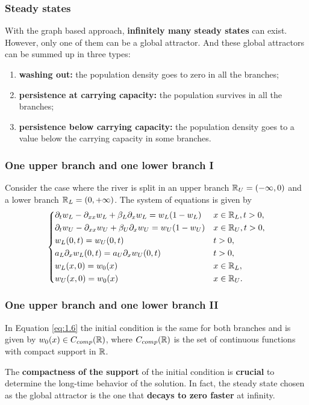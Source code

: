 \begin{frame}
    \frametitle{Steady states}
    With the graph based approach, \textbf{infinitely many steady states }can exist. However, only one of them can be a global attractor. And these global attractors can be summed up in three types:
    \begin{enumerate}
        \item \textbf{washing out:} the population density goes to zero in all the branches;
        \item \textbf{persistence at carrying capacity:} the population survives in all the branches;
        \item \textbf{persistence below carrying capacity:} the population density goes to a value below the carrying capacity in some branches.
    \end{enumerate}
\end{frame}


\begin{frame}
    \frametitle{One upper branch and one lower branch I}
    Consider the case where the river is split in an upper branch \(\mathbb{R}_U = (-\infty, 0)\) and a lower branch \(\mathbb{R}_L = (0, +\infty)\). The system of equations is given by
    \begin{equation}
        \begin{dcases}
            \partial_t w_L - \partial_{xx}w_L + \beta_L \partial_x w_L = w_L(1 - w_L) &  x \in \mathbb{R}_L, t > 0, \\
            \partial_t w_U - \partial_{xx}w_U + \beta_U \partial_x w_U = w_U(1 - w_U) & x \in \mathbb{R}_U, t > 0, \\
            w_L(0, t) = w_U(0, t) &  t > 0, \\
            a_L \partial_x w_L(0, t) = a_U \partial_x w_U(0, t) &  t > 0, \\
            w_L(x, 0) = w_{0}(x) &  x \in \mathbb{R}_L, \\
            w_U(x, 0) = w_{0}(x) &  x \in \mathbb{R}_U.
        \end{dcases}
        \label{eq:1.6}
    \end{equation}
\end{frame}


\begin{frame}
    \frametitle{One upper branch and one lower branch II}
    In Equation \eqref{eq:1.6} the initial condition is the same for both branches and is given by \(w_0(x) \in C_{comp}(\mathbb{R})\), where \(C_{comp}(\mathbb{R})\) is the set of continuous functions with compact support in \(\mathbb{R}\).

    The \textbf{compactness of the support} of the initial condition is \textbf{crucial} to determine the long-time behavior of the solution. In fact, the steady state chosen as the global attractor is the one that \textbf{decays to zero faster} at infinity.
\end{frame}


